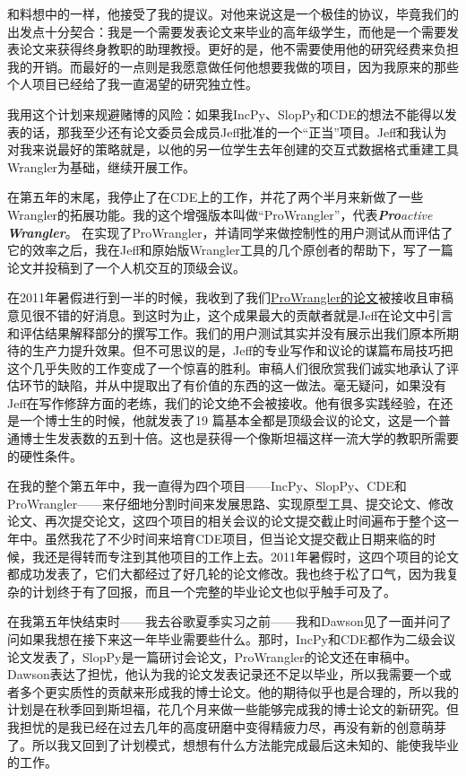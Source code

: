\documentclass[12pt,UTF8,nofonts]{book}
\begin{document}
和料想中的一样，他接受了我的提议。对他来说这是一个极佳的协议，毕竟我们的出发点十分契合：我是一个需要发表论文来毕业的高年级学生，而他是一个需要发表论文来获得终身教职的助理教授。更好的是，他不需要使用他的研究经费来负担我的开销。而最好的一点则是我愿意做任何他想要我做的项目，因为我原来的那些个人项目已经给了我一直渴望的研究独立性。

我用这个计划来规避赌博的风险：如果我IncPy、SlopPy和CDE的想法不能得以发表的话，那我至少还有论文委员会成员Jeff批准的一个“正当”项目。Jeff和我认为对我来说最好的策略就是，以他的另一位学生去年创建的交互式数据格式重建工具Wrangler为基础，继续开展工作。

在第五年的末尾，我停止了在CDE上的工作，并花了两个半月来新做了一些Wrangler的拓展功能。我的这个增强版本叫做“ProWrangler”，代表\emph{\textbf{Pro}active \textbf{Wrangler}}。 在实现了ProWrangler，并请同学来做控制性的用户测试从而评估了它的效率之后，我在Jeff和原始版Wrangler工具的几个原创者的帮助下，写了一篇论文并投稿到了一个人机交互的顶级会议。

在2011年暑假进行到一半的时候，我收到了我们\href{http://www.pgbovine.net/projects/pubs/prowrangler_uist11_camera_ready.pdf}{ProWrangler的论文}被接收且审稿意见很不错的好消息。到这时为止，这个成果最大的贡献者就是Jeff在论文中引言和评估结果解释部分的撰写工作。我们的用户测试其实并没有展示出我们原本所期待的生产力提升效果。但不可思议的是，Jeff的专业写作和议论的谋篇布局技巧把这个几乎失败的工作变成了一个惊喜的胜利。审稿人们很欣赏我们诚实地承认了评估环节的缺陷，并从中提取出了有价值的东西的这一做法。毫无疑问，如果没有Jeff在写作修辞方面的老练，我们的论文绝不会被接收。他有很多实践经验，在还是一个博士生的时候，他就发表了19 篇基本全都是顶级会议的论文，这是一个普通博士生发表数的五到十倍。这也是获得一个像斯坦福这样一流大学的教职所需要的硬性条件。

\breakline

在我的整个第五年中，我一直得为四个项目——IncPy、SlopPy、CDE和ProWrangler——来仔细地分割时间来发展思路、实现原型工具、提交论文、修改论文、再次提交论文，这四个项目的相关会议的论文提交截止时间遍布于整个这一年中。虽然我花了不少时间来培育CDE项目，但当论文提交截止日期来临的时候，我还是得转而专注到其他项目的工作上去。2011年暑假时，这四个项目的论文都成功发表了，它们大都经过了好几轮的论文修改。我也终于松了口气，因为我复杂的计划终于有了回报，而且一个完整的毕业论文也似乎触手可及了。


在我第五年快结束时——我去谷歌夏季实习之前——我和Dawson见了一面并问了问如果我想在接下来这一年毕业需要些什么。那时，IncPy和CDE都作为二级会议论文发表了，SlopPy是一篇研讨会论文，ProWrangler的论文还在审稿中。Dawson表达了担忧，他认为我的论文发表记录还不足以毕业，所以我需要一个或者多个更实质性的贡献来形成我的博士论文。他的期待似乎也是合理的，所以我的计划是在秋季回到斯坦福，花几个月来做一些能够完成我的博士论文的新研究。但我担忧的是我已经在过去几年的高度研磨中变得精疲力尽，再没有新的创意萌芽了。所以我又回到了计划模式，想想有什么方法能完成最后这未知的、能使我毕业的工作。
\end{document}
